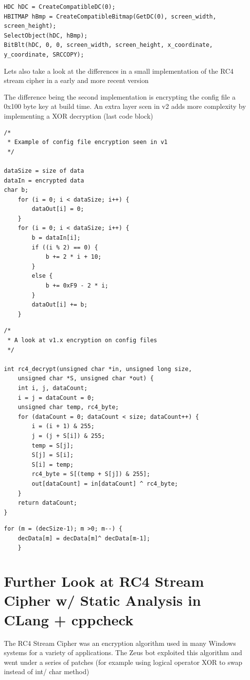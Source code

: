 \documentclass[12pt, letterpaper]{article}
\begin{document}
\begin{sloppypar}
\begin{verbatim}
HDC hDC = CreateCompatibleDC(0);
HBITMAP hBmp = CreateCompatibleBitmap(GetDC(0), screen_width,
screen_height);
SelectObject(hDC, hBmp);
BitBlt(hDC, 0, 0, screen_width, screen_height, x_coordinate,
y_coordinate, SRCCOPY); 
\end{verbatim}

\noindent Lets also take a look at the differences in a small implementation of
the RC4 stream cipher in a early and more recent version

\noindent The difference being the second implementation is encrypting the config
file a 0x100 byte key at build time. An extra layer scen in v2 adds more
complexity by implementing a XOR decryption (last code block)


\begin{verbatim}
/*
 * Example of config file encryption seen in v1
 */

dataSize = size of data
dataIn = encrypted data
char b;
    for (i = 0; i < dataSize; i++) {
        dataOut[i] = 0;
    }
    for (i = 0; i < dataSize; i++) {
        b = dataIn[i];
        if ((i % 2) == 0) {
            b += 2 * i + 10;
        }
        else {
            b += 0xF9 - 2 * i;
        }
        dataOut[i] += b;
    }
\end{verbatim}

\begin{verbatim}
/*
 * A look at v1.x encryption on config files
 */

int rc4_decrypt(unsigned char *in, unsigned long size, 
    unsigned char *S, unsigned char *out) {
    int i, j, dataCount;
    i = j = dataCount = 0;
    unsigned char temp, rc4_byte;
    for (dataCount = 0; dataCount < size; dataCount++) {
        i = (i + 1) & 255;
        j = (j + S[i]) & 255;
        temp = S[j];
        S[j] = S[i];
        S[i] = temp;
        rc4_byte = S[(temp + S[j]) & 255];
        out[dataCount] = in[dataCount] ^ rc4_byte;
    }   
    return dataCount;
} 
\end{verbatim}
\begin{verbatim}
for (m = (decSize-1); m >0; m--) {
    decData[m] = decData[m]^ decData[m-1];
    }
\end{verbatim}

\section*{Further Look at RC4 Stream Cipher w/ Static Analysis in CLang + cppcheck}
The RC4 Stream Cipher was an encryption algorithm used in many Windows
systems for a variety of applications. The Zeus bot exploited this
algorithm and went under a series of patches (for example using logical
operator XOR to swap instead of int/ char method)


\end{sloppypar}
\end{document}

